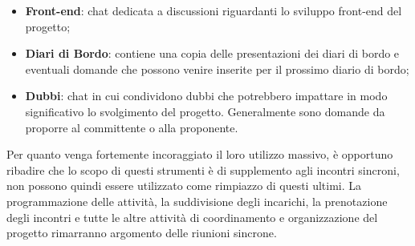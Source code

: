 \documentclass[a4paper,12pt]{article}
\begin{document}
\begin{itemize}
\begin{itemize}
                        \item \textbf{Front-end}: chat dedicata a discussioni riguardanti lo sviluppo front-end del progetto;
                        \item \textbf{Diari di Bordo}: contiene una copia delle presentazioni dei diari di bordo e eventuali domande che possono venire inserite per il prossimo diario di bordo;
                        \item \textbf{Dubbi}: chat in cui condividono dubbi che potrebbero impattare in modo significativo lo svolgimento del progetto.
                            Generalmente sono domande da proporre al committente o alla proponente.
                    \end{itemize}
                \end{itemize}
                Per quanto venga fortemente incoraggiato il loro utilizzo massivo, è opportuno ribadire che lo scopo di questi strumenti è di supplemento agli incontri sincroni, non possono quindi essere utilizzato come rimpiazzo di questi ultimi.
                La programmazione delle attività, la suddivisione degli incarichi, la prenotazione degli incontri e tutte le altre attività di coordinamento e organizzazione del progetto rimarranno argomento delle riunioni sincrone.
        
\end{document}
